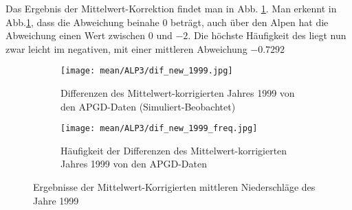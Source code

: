 Das Ergebnis der Mittelwert-Korrektion findet man in Abb. \ref{fig:dif_new_1999}. Man erkennt in Abb.\ref{fig:dif_new_1999}, dass die Abweichung beinahe $0$ beträgt, auch über den Alpen hat die Abweichung einen Wert zwischen $0$ und $-2$. Die höchste Häufigkeit des liegt nun zwar leicht im negativen, mit einer mittleren Abweichung $-0.7292$


\begin{figure}[hbt!]
	\begin{subfigure}{0.49\textwidth}
			\texttt{[image: mean/ALP3/dif\_new\_1999.jpg]}
		\caption{Differenzen des Mittelwert-korrigierten Jahres 1999 von den APGD-Daten (Simuliert-Beobachtet)}
		\label{fig:dif_new_1999}
	\end{subfigure}
	\begin{subfigure}{0.49\textwidth}
		\texttt{[image: mean/ALP3/dif\_new\_1999\_freq.jpg]}
		\caption{Häufigkeit der Differenzen des Mittelwert-korrigierten Jahres 1999 von den APGD-Daten}
		\label{fig:dif_new_1999_freq}
	\end{subfigure}
\caption{Ergebnisse der Mittelwert-Korrigierten mittleren Niederschläge des Jahre 1999}
\end{figure}
